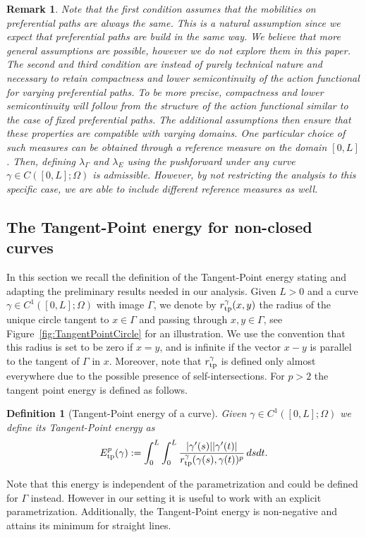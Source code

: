 \documentclass{article}
\newtheorem{definition}[theorem]{Definition}
\newtheorem{remark}[theorem]{Remark}
\begin{document}
\begin{remark}
    Note that the first condition assumes that the mobilities on preferential paths are always the same. This is a natural assumption since we expect that preferential paths are build in the same way. We believe that more general assumptions are possible, however we do not explore them in this paper. The second and third condition are instead of purely technical nature and necessary to retain compactness and lower semicontinuity of the action functional for varying preferential paths. 
    To be more precise, compactness and lower semicontinuity will follow from the structure of the action functional similar to the case of fixed preferential paths. The additional assumptions then ensure that these properties are compatible with varying domains. 
    One particular choice of such measures can be obtained through a reference measure on the domain $[0,L]$. Then, defining $\lambda_\Gamma$ and $\lambda_E$ using the pushforward under any curve $\gamma\in C([0,L];\Omega)$ is admissible. However, by not restricting the analysis to this specific case, we are able to include different reference measures as well.
\end{remark}

\subsection{The Tangent-Point energy for non-closed curves}\label{TPEcurves}

In this section we recall the definition of the Tangent-Point energy \cite{STRZELECKI_2012} stating and adapting the preliminary results needed in our analysis. Given $L>0$ and a curve $\gamma \in C^1([0,L]; \Omega)$ with image $\Gamma$, we denote by $r_{\rm tp}^{\gamma}(x,y)$ the radius of the unique circle tangent to $x\in\Gamma$ and passing through $x,y\in\Gamma$, see Figure~\ref{fig:TangentPointCircle} for an illustration. We use the convention that this radius is set to be zero if $x=y$, and is infinite if the vector $x-y$ is parallel to the tangent of $\Gamma$ in $x$. Moreover, note that $r_{\rm tp}^{\gamma}$ is defined only almost everywhere due to the possible presence of self-intersections. For $p>2$ the tangent point energy is defined as follows.

\begin{definition}[Tangent-Point energy of a curve]
Given $\gamma \in C^1([0,L]; \Omega)$ we define its Tangent-Point energy as
\begin{align}
E_{\rm tp}^p (\gamma) := \int_0^L \int_0^L\frac{|\gamma'(s)||\gamma'(t)|}{r_{\rm tp}^{\gamma}(\gamma(s), \gamma(t))^p} \, ds dt.
\end{align}
\end{definition}
Note that this energy is independent of the parametrization and could be defined for $\Gamma$ instead. However in our setting it is useful to work with an explicit parametrization. Additionally, the Tangent-Point energy is non-negative and attains its minimum for straight lines. 
\end{document}
